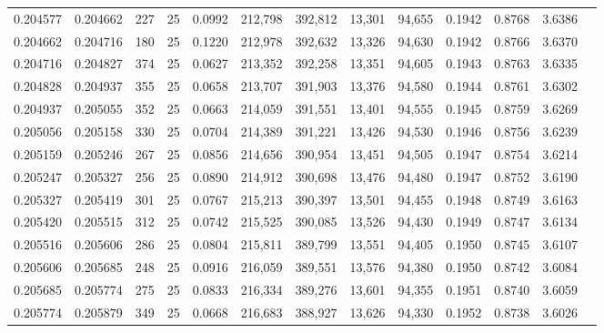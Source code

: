 \begin{tabular}{rrrrrrrrrrrrr}
0.204577 & 0.204662 &   227 &  25 &                                     0.0992 & 212,798 & 392,812 &  13,301 &  94,655 & 0.1942 & 0.8768 & 3.6386 \\
0.204662 & 0.204716 &   180 &  25 &                                     0.1220 & 212,978 & 392,632 &  13,326 &  94,630 & 0.1942 & 0.8766 & 3.6370 \\
0.204716 & 0.204827 &   374 &  25 &                                     0.0627 & 213,352 & 392,258 &  13,351 &  94,605 & 0.1943 & 0.8763 & 3.6335 \\
0.204828 & 0.204937 &   355 &  25 &                                     0.0658 & 213,707 & 391,903 &  13,376 &  94,580 & 0.1944 & 0.8761 & 3.6302 \\
0.204937 & 0.205055 &   352 &  25 &                                     0.0663 & 214,059 & 391,551 &  13,401 &  94,555 & 0.1945 & 0.8759 & 3.6269 \\
0.205056 & 0.205158 &   330 &  25 &                                     0.0704 & 214,389 & 391,221 &  13,426 &  94,530 & 0.1946 & 0.8756 & 3.6239 \\
0.205159 & 0.205246 &   267 &  25 &                                     0.0856 & 214,656 & 390,954 &  13,451 &  94,505 & 0.1947 & 0.8754 & 3.6214 \\
0.205247 & 0.205327 &   256 &  25 &                                     0.0890 & 214,912 & 390,698 &  13,476 &  94,480 & 0.1947 & 0.8752 & 3.6190 \\
0.205327 & 0.205419 &   301 &  25 &                                     0.0767 & 215,213 & 390,397 &  13,501 &  94,455 & 0.1948 & 0.8749 & 3.6163 \\
0.205420 & 0.205515 &   312 &  25 &                                     0.0742 & 215,525 & 390,085 &  13,526 &  94,430 & 0.1949 & 0.8747 & 3.6134 \\
0.205516 & 0.205606 &   286 &  25 &                                     0.0804 & 215,811 & 389,799 &  13,551 &  94,405 & 0.1950 & 0.8745 & 3.6107 \\
0.205606 & 0.205685 &   248 &  25 &                                     0.0916 & 216,059 & 389,551 &  13,576 &  94,380 & 0.1950 & 0.8742 & 3.6084 \\
0.205685 & 0.205774 &   275 &  25 &                                     0.0833 & 216,334 & 389,276 &  13,601 &  94,355 & 0.1951 & 0.8740 & 3.6059 \\
0.205774 & 0.205879 &   349 &  25 &                                     0.0668 & 216,683 & 388,927 &  13,626 &  94,330 & 0.1952 & 0.8738 & 3.6026 \\

\end{tabular}
